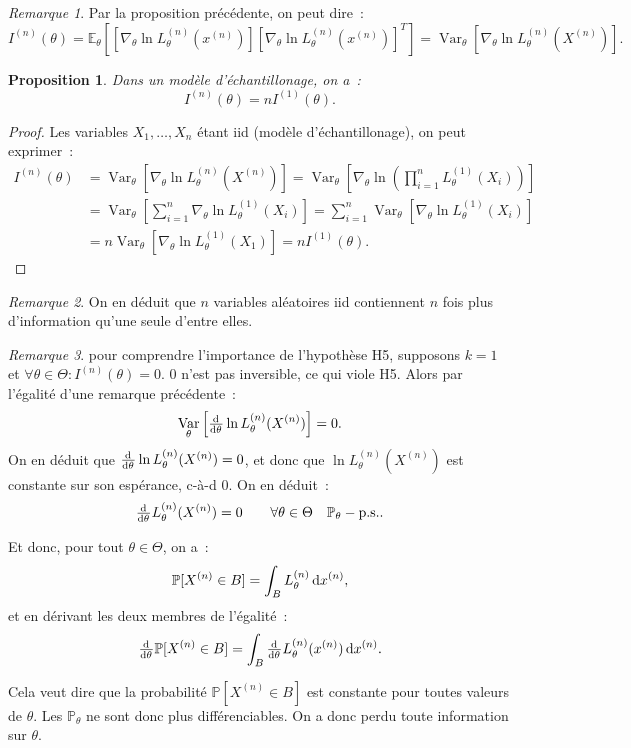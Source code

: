 \documentclass{report}
\DeclareMathOperator{\Var}{Var}
\renewcommand{\P}{\mathbb P}
\newcommand{\E}{\mathbb E}
\newcommand{\ps}{{\text{p.s.}}}
\newtheorem{prp}[thm]{Proposition}
\theoremstyle{definition}
\theoremstyle{remark}
\newtheorem*{rmq}{Remarque}
\begin{document}
			\begin{rmq} Par la proposition précédente, on peut dire~:
			\[I^{(n)}(\theta) = \E_\theta\left[\left[\nabla_\theta\ln L_\theta^{(n)}(x^{(n)})\right]\left[\nabla_\theta\ln L_\theta^{(n)}(x^{(n)})\right]^T\right]
				= \Var_\theta\left[\nabla_\theta\ln L_\theta^{(n)}(X^{(n)})\right].\]
			\end{rmq}

			\begin{prp} Dans un modèle d'échantillonage, on a~:
			\[I^{(n)}(\theta) = nI^{(1)}(\theta).\]
			\end{prp}

			\begin{proof} Les variables $X_1, \ldots, X_n$ étant iid (modèle d'échantillonage), on peut exprimer~:
			\begin{align*}
				I^{(n)}(\theta) &= \Var_\theta\left[\nabla_\theta \ln L_\theta^{(n)}(X^{(n)})\right]
					= \Var_\theta\left[\nabla_\theta \ln\left(\prod_{i=1}^n L_\theta^{(1)}(X_i)\right)\right] \\
				&= \Var_\theta\left[\sum_{i=1}^n\nabla_\theta \ln L_\theta^{(1)}(X_i)\right]
					= \sum_{i=1}^n\Var_\theta\left[\nabla_\theta \ln L_\theta^{(1)}(X_i)\right] \\
				&= n\Var_\theta\left[\nabla_\theta \ln L_\theta^{(1)}(X_1)\right] = nI^{(1)}(\theta).
			\end{align*}
			\end{proof}

			\begin{rmq} On en déduit que $n$ variables aléatoires iid contiennent $n$ fois plus d'information qu'une seule d'entre elles.
			\end{rmq}

			\begin{rmq} pour comprendre l'importance de l'hypothèse H5, supposons $k=1$ et $\forall \theta \in \Theta : I^{(n)}(\theta) = 0$. $0$ n'est pas inversible,
			ce qui viole H5. Alors par l'égalité d'une remarque précédente~:
			\[\Var_\theta\left[\od {}\theta \ln L_\theta^{(n)}(X^{(n)})\right] = 0.\]
			On en déduit que $\od {}\theta \ln L_\theta^{(n)}(X^{(n)}) = 0$, et donc que $\ln L_\theta^{(n)}(X^{(n)})$ est constante sur son espérance, c-à-d $0$.
			On en déduit~:
			\[\od{}\theta L_\theta^{(n)}(X^{(n)}) = 0 \qquad\forall \theta \in \Theta\quad \P_\theta-\ps.\]

			Et donc, pour tout $\theta \in \Theta$, on a~:
			\[\P[X^{(n)} \in B] = \int_B L_\theta^{(n)}\dif x^{(n)},\]
			et en dérivant les deux membres de l'égalité~:
			\[\od {}\theta\P[X^{(n)} \in B] = \int_B\od {}\theta L_\theta^{(n)}(x^{(n)})\dif x^{(n)}.\]

			Cela veut dire que la probabilité $\P[X^{(n)} \in B]$ est constante pour toutes valeurs de $\theta$. Les $\P_\theta$ ne sont donc plus différenciables.
			On a donc perdu toute information sur $\theta$.
			\end{rmq}
\end{document}
